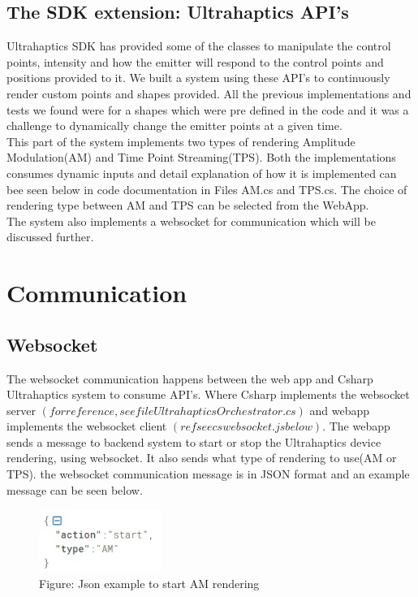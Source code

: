 \subsection*{The SDK extension: Ultrahaptics API's} 
Ultrahaptics SDK\cite{Ultrahaptics-APIs} has provided some of the classes to manipulate the control points, 
intensity and how the emitter will respond to the control points and positions provided to it. We built a 
system using these API's to continuously render custom points and shapes provided. 
All the previous implementations and tests we found were for a shapes which were pre defined in the code 
and it was a challenge to dynamically change the emitter points at a given time.  \\
This part of the system implements two types of rendering Amplitude Modulation(AM) and Time Point Streaming(TPS).
Both the implementations consumes dynamic inputs and detail explanation of how it is implemented 
can bee seen below in code documentation in Files AM.cs and TPS.cs. The choice of rendering type 
between AM and TPS can be selected from the WebApp. \\
The system also implements a websocket for communication which will be discussed further. 

\section{Communication}
\subsection*{Websocket}
The websocket communication happens between the web app and Csharp Ultrahaptics system to consume API's.
Where Csharp implements the websocket server $(for reference, see file UltrahapticsOrchestrator.cs)$ and webapp implements the 
websocket client $(ref see cswebsocket.js below)$. The webapp sends a message to backend system to start or stop the
Ultrahaptics device rendering, using websocket. It also sends what type of rendering to use(AM or TPS). the websocket 
communication message is in JSON format and an example message can be seen below.
\begin{figure}[htb]
	\includegraphics[width=40mm]{gfx/jsonstart.jpeg}
	\caption{Figure: Json example to start AM rendering}
	\label{fig:architecture:json}
\end{figure}


